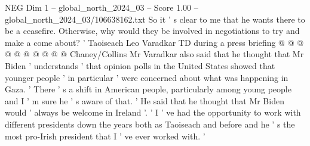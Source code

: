 \begin{textsample}{NEG Dim 1 – global\_north\_2024\_03 – Score 1.00 – global\_north\_2024\_03/106638162.txt}
So it ' s clear to me that he wants there to be a ceasefire.
Otherwise, why would they be involved in negotiations to try and make a come about? ' Taoiseach Leo Varadkar TD during a press briefing @ @ @ @ @ @ @ @ @ @ Chaney/Collins Mr Varadkar also said that he thought that Mr Biden ' understands ' that opinion polls in the United States showed that younger people ' in particular ' were concerned about what was happening in Gaza. ' There ' s a shift in American people, particularly among young people and I ' m sure he ' s aware of that. ' He said that he thought that Mr Biden would ' always be welcome in Ireland '. ' I ' ve had the opportunity to work with different presidents down the years both as Taoiseach and before and he ' s the most pro-Irish president that I ' ve ever worked with. '

\end{textsample}
